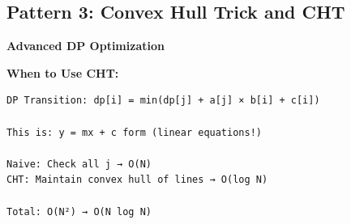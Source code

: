 \documentclass[11pt,a4paper,oneside]{book}
\begin{document}
\subsection{Pattern 3: Convex Hull Trick and CHT}

\begin{tcolorbox}[
    enhanced,breakable,
    colback=warnyellow!10,
    colframe=warnyellow,
    boxrule=2pt,
    arc=4mm,
    title=\textbf{Complete Convex Hull Trick Algorithms}
]
\textbf{Advanced DP Optimization}

\textbf{When to Use CHT:}
\begin{verbatim}
DP Transition: dp[i] = min(dp[j] + a[j] × b[i] + c[i])

This is: y = mx + c form (linear equations!)

Naive: Check all j → O(N)
CHT: Maintain convex hull of lines → O(log N)

Total: O(N²) → O(N log N)
\end{verbatim}
\end{tcolorbox}
\end{document}
